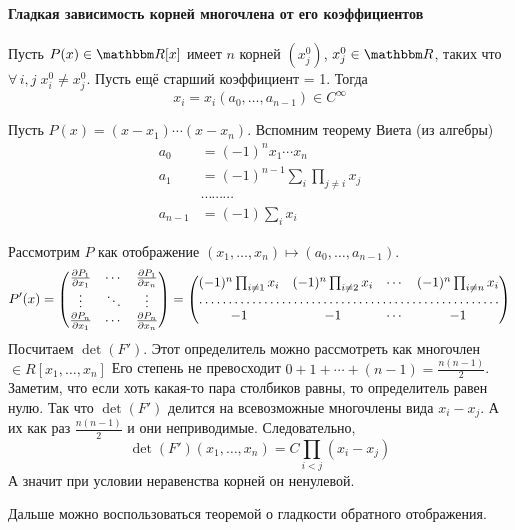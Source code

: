 \documentclass[12pt,timbord]{../../../notes}
\begin{document}
\paragraph{Гладкая зависимость корней многочлена от его коэффициентов}
\label{par:diffspace::smoothpolyroots}

\begin{thrm}\label{thrm:diffspace::smoothpolyroots}
  Пусть $P(x) \in \R[x]$ имеет $n$ корней $(x^0_j)$,  $x^0_j \in \R$, таких что $\forall\, i,j \;
  x^0_i \neq x^0_j$. Пусть ещё старший коэффициент = 1. 
  Тогда 
  \[
    x_i = x_i(a_0, \dotsc, a_{n-1}) \in C^\infty
  \]
\end{thrm}

\begin{ittproof}
  Пусть $P(x) = (x - x_1) \dotsm (x - x_n)$. Вспомним теорему Виета (из алгебры)
  \begin{align*}
    a_0     & = (-1)^n x_1 \dotsm x_n \\
    a_1     & = (-1)^{n-1} \sum_{i} \prod_{j \neq i} x_j \\
            & \cdots \cdots \cdots  \\
    a_{n-1} & = (-1) \sum_i x_i
  \end{align*}

  Рассмотрим $P$ как отображение $(x_1, \dotsc, x_n) \mapsto (a_0, \dotsc, a_{n-1})$.
  \[
    P'(x) = 
    \begin{pmatrix}
      \frac{\partial P_1}{\partial x_1} & \cdots & \frac{\partial P_1}{\partial x_n} \\
      \vdots & \ddots & \vdots \\
      \frac{\partial P_n}{\partial x_1} & \cdots & \frac{\partial P_n}{\partial x_n} \\
    \end{pmatrix}
    = 
    \begin{pmatrix}
      (-1)^n \prod_{i\neq 1} x_i & (-1)^n \prod_{i\neq 2} x_i & \cdots & (-1)^n \prod_{i\neq n} x_i \\
      \hdotsfor{4} \\
      -1 & -1 & \cdots & -1 
    \end{pmatrix}
  \]
  Посчитаем $\det(F')$. Этот определитель можно рассмотреть как многочлен $\in R[x_1, \dotsc, x_n]$
  Его степень не превосходит $0 + 1 + \dotsb + (n-1) = \frac{n(n-1)}{2}$. Заметим, что если хоть
  какая-то пара столбиков равны, то определитель равен нулю. Так что $\det(F')$ делится на
  всевозможные многочлены вида $x_i - x_j$. А их как раз $\frac{n(n-1)}{2}$ и они неприводимые.
  Следовательно, 
  \[
    \det (F')(x_1, \dotsc, x_n) = C \prod_{i<j} (x_i - x_j) 
  \]
  А значит при условии неравенства корней он ненулевой.

  Дальше можно воспользоваться теоремой о гладкости обратного отображения.
\end{ittproof}
\end{document}
